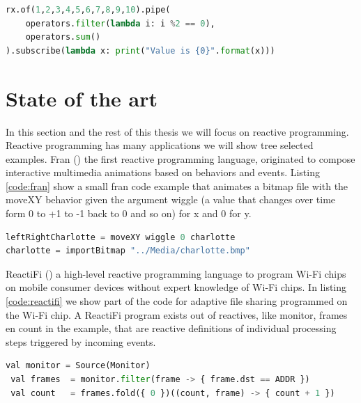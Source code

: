 \documentclass[a4paper]{book}
\begin{document}
\begin{lstlisting}[language=Python, caption={Python, RxPy library},captionpos=b, label={code:rxpy}, basicstyle=\small\ttfamily, frame=single]
rx.of(1,2,3,4,5,6,7,8,9,10).pipe(
	operators.filter(lambda i: i %2 == 0),
	operators.sum()
).subscribe(lambda x: print("Value is {0}".format(x)))
\end{lstlisting}


\section{State of the art}

In this section and the rest of this thesis we will focus on reactive programming. Reactive programming has many applications we will show tree selected examples. Fran (\cite{DBLP:conf/icfp/ElliottH97}) the first reactive programming language, originated to compose interactive multimedia animations based on behaviors and events. Listing \ref{code:fran} show a small fran code example that animates a bitmap file with the moveXY behavior given the argument wiggle (a value that changes over time form 0 to +1 to -1 back to 0 and so on) for x and 0 for y.
\begin{lstlisting}[language=Python, caption={Fran, animation},captionpos=b, label={code:fran}, basicstyle=\small\ttfamily, frame=single]
leftRightCharlotte = moveXY wiggle 0 charlotte
charlotte = importBitmap "../Media/charlotte.bmp"
\end{lstlisting}

ReactiFi (\cite{DBLP:journals/programming/SterzEMBGHMF21}) a high-level reactive programming language to program Wi-Fi chips on mobile consumer devices without expert knowledge of Wi-Fi chips. In listing \ref{code:reactifi} we show part of the code for adaptive file sharing programmed on the Wi-Fi chip. A ReactiFi program exists out of reactives, like monitor, frames en count in the example, that are reactive definitions of individual processing steps triggered by incoming events.

\begin{lstlisting}[language=Python, caption={ReactiFi, Wi-Fi file sharing},captionpos=b, label={code:reactifi}, basicstyle=\small\ttfamily, frame=single]
 val monitor = Source(Monitor)
 val frames  = monitor.filter(frame -> { frame.dst == ADDR })
 val count   = frames.fold({ 0 })((count, frame) -> { count + 1 })
\end{lstlisting}
\end{document}
